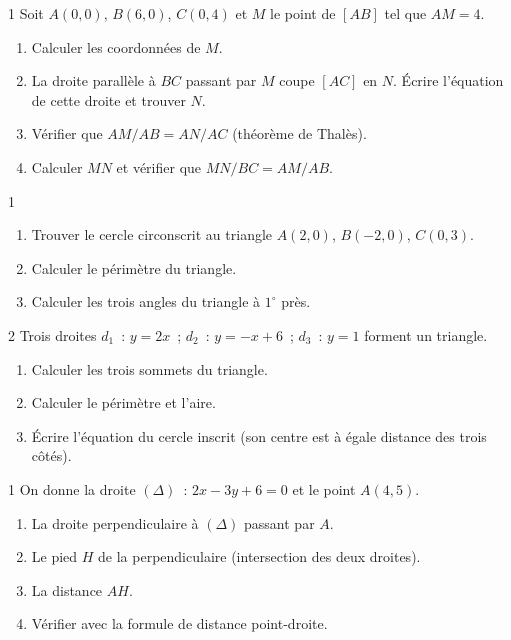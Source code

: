 \begin{probleme}{1}
Soit $A(0,0)$, $B(6,0)$, $C(0,4)$ et $M$ le point de $[AB]$ tel que $AM=4$.
\begin{enumerate}
  \item Calculer les coordonn\'ees de $M$.
  \item La droite parall\`ele \`a $BC$ passant par $M$ coupe $[AC]$ en $N$.
        \'Ecrire l'\'equation de cette droite et trouver $N$.
  \item V\'erifier que $AM/AB = AN/AC$ (th\'eor\`eme de Thal\`es).
  \item Calculer $MN$ et v\'erifier que $MN/BC = AM/AB$.
\end{enumerate}
\end{probleme}

\begin{probleme}{1}
\begin{enumerate}
  \item Trouver le cercle circonscrit au triangle $A(2,0)$, $B(-2,0)$, $C(0,3)$.
  \item Calculer le p\'erim\`etre du triangle.
  \item Calculer les trois angles du triangle \`a $1^{\circ}$ pr\`es.
\end{enumerate}
\end{probleme}

\begin{probleme}{2}
Trois droites $d_1$~: $y=2x$~; $d_2$~: $y=-x+6$~; $d_3$~: $y=1$
forment un triangle.
\begin{enumerate}
  \item Calculer les trois sommets du triangle.
  \item Calculer le p\'erim\`etre et l'aire.
  \item \'Ecrire l'\'equation du cercle inscrit
        (son centre est \`a \'egale distance des trois c\^ot\'es).
\end{enumerate}
\end{probleme}

\begin{probleme}{1}
On donne la droite $(\Delta)$~: $2x-3y+6=0$ et le point $A(4,5)$.
\begin{enumerate}
  \item La droite perpendiculaire \`a $(\Delta)$ passant par $A$.
  \item Le pied $H$ de la perpendiculaire (intersection des deux droites).
  \item La distance $AH$.
  \item V\'erifier avec la formule de distance point-droite.
\end{enumerate}
\end{probleme}

